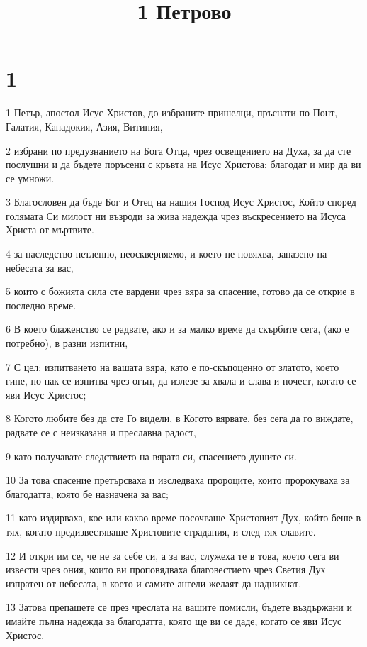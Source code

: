 

\title{1 Петрово}


\chapter{1}

\par 1 Петър, апостол Исус Христов, до избраните пришелци, пръснати по Понт, Галатия, Кападокия, Азия, Витиния,
\par 2 избрани по предузнанието на Бога Отца, чрез освещението на Духа, за да сте послушни и да бъдете поръсени с кръвта на Исус Христова; благодат и мир да ви се умножи.
\par 3 Благословен да бъде Бог и Отец на нашия Господ Исус Христос, Който според голямата Си милост ни възроди за жива надежда чрез въскресението на Исуса Христа от мъртвите.
\par 4 за наследство нетленно, неоскверняемо, и което не повяхва, запазено на небесата за вас,
\par 5 които с божията сила сте вардени чрез вяра за спасение, готово да се открие в последно време.
\par 6 В което блаженство се радвате, ако и за малко време да скърбите сега, (ако е потребно), в разни изпитни,
\par 7 С цел: изпитването на вашата вяра, като е по-скъпоценно от златото, което гине, но пак се изпитва чрез огън, да излезе за хвала и слава и почест, когато се яви Исус Христос;
\par 8 Когото любите без да сте Го видели, в Когото вярвате, без сега да го виждате, радвате се с неизказана и преславна радост,
\par 9 като получавате следствието на вярата си, спасението душите си.
\par 10 За това спасение претърсваха и изследваха пророците, които пророкуваха за благодатта, която бе назначена за вас;
\par 11 като издирваха, кое или какво време посочваше Христовият Дух, който беше в тях, когато предизвестяваше Христовите страдания, и след тях славите.
\par 12 И откри им се, че не за себе си, а за вас, служеха те в това, което сега ви извести чрез ония, които ви проповядваха благовестието чрез Светия Дух изпратен от небесата, в което и самите ангели желаят да надникнат.
\par 13 Затова препашете се през чреслата на вашите помисли, бъдете въздържани и имайте пълна надежда за благодатта, която ще ви се даде, когато се яви Исус Христос.
